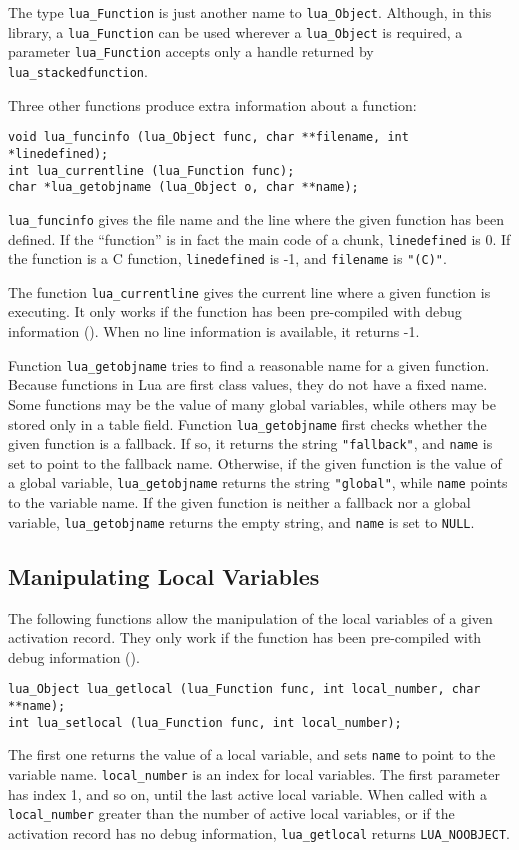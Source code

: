 The type \verb'lua_Function' is just another name
to \verb'lua_Object'.
Although, in this library,
a \verb'lua_Function' can be used wherever a \verb'lua_Object' is required,
a parameter \verb'lua_Function' accepts only a handle returned by
\verb'lua_stackedfunction'.

Three other functions produce extra information about a function:
\begin{verbatim}
void lua_funcinfo (lua_Object func, char **filename, int *linedefined);
int lua_currentline (lua_Function func);
char *lua_getobjname (lua_Object o, char **name);
\end{verbatim}
\verb'lua_funcinfo' gives the file name and the line where the
given function has been defined.
If the ``function'' is in fact the main code of a chunk,
\verb'linedefined' is 0.
If the function is a C function,
\verb'linedefined' is -1, and \verb'filename' is \verb'"(C)"'.

The function \verb'lua_currentline' gives the current line where
a given function is executing.
It only works if the function has been pre-compiled with debug
information ().
When no line information is available, it returns -1.

Function \verb'lua_getobjname' tries to find a reasonable name for
a given function.
Because functions in Lua are first class values,
they do not have a fixed name.
Some functions may be the value of many global variables,
while others may be stored only in a table field.
Function \verb'lua_getobjname' first checks whether the given
function is a fallback.
If so, it returns the string \verb'"fallback"',
and \verb'name' is set to point to the fallback name.
Otherwise, if the given function is the value of a global variable,
\verb'lua_getobjname' returns the string \verb'"global"',
while \verb'name' points to the variable name.
If the given function is neither a fallback nor a global variable,
\verb'lua_getobjname' returns the empty string,
and \verb'name' is set to \verb'NULL'.

\subsection{Manipulating Local Variables}

The following functions allow the manipulation of the
local variables of a given activation record.
They only work if the function has been pre-compiled with debug
information ().
\begin{verbatim}
lua_Object lua_getlocal (lua_Function func, int local_number, char **name);
int lua_setlocal (lua_Function func, int local_number);
\end{verbatim}
The first one returns the value of a local variable,
and sets \verb'name' to point to the variable name.
\verb'local_number' is an index for local variables.
The first parameter has index 1, and so on, until the
last active local variable.
When called with a \verb'local_number' greater than the
number of active local variables,
or if the activation record has no debug information,
\verb'lua_getlocal' returns \verb'LUA_NOOBJECT'.

